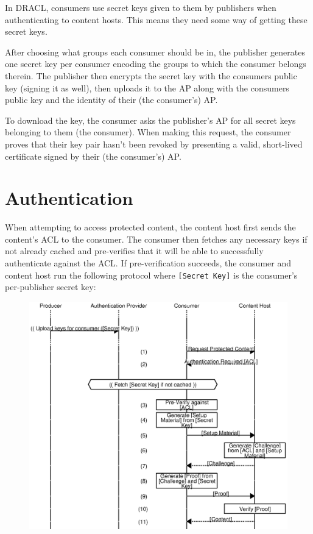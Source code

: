 \documentclass[pdftex,12pt,a4papaer]{report}
\begin{document}
In DRACL, consumers use secret keys given to them by publishers when
authenticating to content hosts. This means they need some way of getting these
secret keys.

After choosing what groups each consumer should be in, the publisher
generates one secret key per consumer encoding the groups to which the consumer
belongs therein. The publisher then encrypts the secret key with the consumers
public key (signing it as well), then uploads it to the AP along with the
consumers public key and the identity of their (the consumer's) AP.

To download the key, the consumer asks the publisher's AP for all secret
keys belonging to them (the consumer). When making this request, the consumer
proves that their key pair hasn't been revoked by presenting a valid,
short-lived certificate signed by their (the consumer's) AP.

\section{Authentication}
\label{sub:authentication}

When attempting to access protected content, the content host first sends the
content's ACL to the consumer. The consumer then fetches any necessary keys if
not already cached and pre-verifies that it will be able to successfully
authenticate against the ACL. If pre-verification succeeds, the consumer and
content host run the following protocol where \verb=[Secret Key]= is the
consumer's per-publisher secret key:

\begin{figure}[H]
    \includegraphics{auth.eps}
\end{figure}
\end{document}
